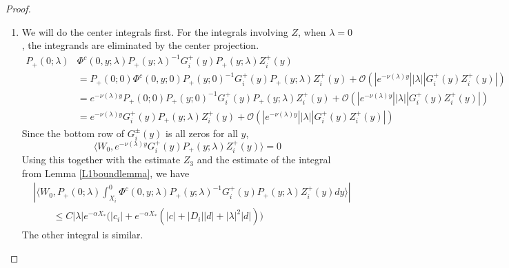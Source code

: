 \documentclass[thesis.tex]{subfiles}
\begin{document}
\begin{lemma}
\begin{proof}
\begin{enumerate}
\item We will do the center integrals first. For the integrals involving $Z$, when $\lambda = 0$, the integrands are eliminated by the center projection. 
\begin{align*}
P_+(0; \lambda) &\Phi^c(0, y; \lambda) P_+(y; \lambda)^{-1} G_i^+(y) P_+(y; \lambda) Z_i^+(y) \\
&= P_+(0; 0) \Phi^c(0, y; 0) P_+(y; 0)^{-1} G_i^+(y) P_+(y; \lambda) Z_i^+(y) + \mathcal{O}(|e^{-\nu(\lambda) y}||\lambda||G_i^+(y) Z_i^+(y)|) \\
&= e^{-\nu(\lambda) y} P_+(0; 0) P_+(y; 0)^{-1} G_i^+(y) P_+(y; \lambda) Z_i^+(y) + \mathcal{O}(|e^{-\nu(\lambda) y}||\lambda||G_i^+(y) Z_i^+(y)|) \\
&= e^{-\nu(\lambda) y} G_i^+(y) P_+(y; \lambda) Z_i^+(y) + \mathcal{O}(|e^{-\nu(\lambda) y}||\lambda||G_i^+(y) Z_i^+(y)|)
\end{align*}
Since the bottom row of $G_i^\pm(y)$ is all zeros for all $y$, 
\[
\langle W_0, e^{-\nu(\lambda) y} G_i^+(y) P_+(y; \lambda) Z_i^+(y) \rangle = 0
\]
Using this together with the estimate $Z_3$ and the estimate of the integral from Lemma \ref{L1boundlemma}, we have
\begin{align*}
&\left| \langle W_0, P_+(0; \lambda) \int_{X_i}^0 \Phi^c(0, y; \lambda) P_+(y; \lambda)^{-1} G_i^+(y) P_+(y; \lambda) Z_i^+(y) dy \rangle \right| \\
&\qquad \leq C |\lambda| e^{-\alpha X_*}\Big(|c_i| + e^{-\alpha X_*}\left(|c| + |D_i||d| + |\lambda|^2|d|\right) \Big)
\end{align*}
The other integral is similar.


\end{enumerate}
\end{proof}
\end{lemma}
\end{document}
